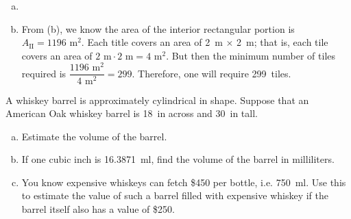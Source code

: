\documentclass[11pt,letterpaper]{article}
\begin{document}
\begin{enumerate}[(a)]
\item 









\item From (b), we know the area of the interior rectangular portion is $A_{\text{II}}= 1196 \text{ m}^2$. Each title covers an area of 2~m $\times$ 2~m; that is, each tile covers an area of $2 \text{ m} \cdot 2 \text{ m}= 4 \text{ m}^2$. But then the minimum number of tiles required is $\dfrac{1196 \text{ m}^2}{4 \text{ m}^2}= 299$. Therefore, one will require 299~tiles. 
\end{enumerate}



\newpage



 A whiskey barrel is approximately cylindrical in shape. Suppose that an American Oak whiskey barrel is 18~in across and 30~in tall.
	\begin{enumerate}[(a)]
	\item Estimate the volume of the barrel. 
	\item If one cubic inch is 16.3871~ml, find the volume of the barrel in milliliters. 
	\item You know expensive whiskeys can fetch \$450 per bottle, i.e. 750~ml. Use this to estimate the value of such a barrel filled with expensive whiskey if the barrel itself also has a value of \$250.
	\end{enumerate} \pspace
\end{document}
